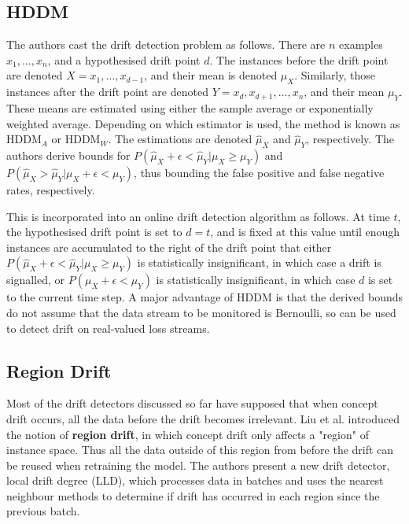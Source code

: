 \subsection{HDDM}

The authors cast the drift detection problem as follows. There are $n$ examples $x_1,\dots,x_n$, and a hypothesised drift point $d$. The instances before the drift point are denoted $X=x_1,\dots,x_{d-1}$, and their mean is denoted $\mu_X$. Similarly, those instances after the drift point are denoted $Y=x_d,x_{d+1},\dots,x_n$, and their mean $\mu_Y$. These means are estimated using either the sample average or exponentially weighted average. Depending on which estimator is used, the method is known as HDDM$_A$ or HDDM$_W$. The estimations are denoted $\hat{\mu}_X$ and $\hat{\mu}_Y$, respectively. The authors derive bounds for $P(\hat{\mu}_X+\epsilon < \hat{\mu}_Y|\mu_X \ge \mu_Y)$ and $P(\hat{\mu}_X > \hat{\mu}_Y|\mu_X+\epsilon < \mu_Y)$, thus bounding the false positive and false negative rates, respectively.

This is incorporated into an online drift detection algorithm as follows. At time $t$, the hypothesised drift point is set to $d=t$, and is fixed at this value until enough instances are accumulated to the right of the drift point that either $P(\hat{\mu}_X+\epsilon < \hat{\mu}_Y|\mu_X \ge \mu_Y)$ is statistically insignificant, in which case a drift is signalled, or $P(\mu_X+\epsilon < \mu_Y)$ is statistically insignificant, in which case $d$ is set to the current time step. A major advantage of HDDM is that the derived bounds do not assume that the data stream to be monitored is Bernoulli, so can be used to detect drift on real-valued loss streams.

\subsection{Region Drift}

Most of the drift detectors discussed so far have supposed that when concept drift occurs, all the data before the drift becomes irrelevant. Liu et al. \cite{LLD} introduced the notion of {\bf region drift}, in which concept drift only affects a "region" of instance space. Thus all the data outside of this region from before the drift can be reused when retraining the model. The authors present a new drift detector, local drift degree (LLD), which processes data in batches and uses the nearest neighbour methods to determine if drift has occurred in each region since the previous batch.

